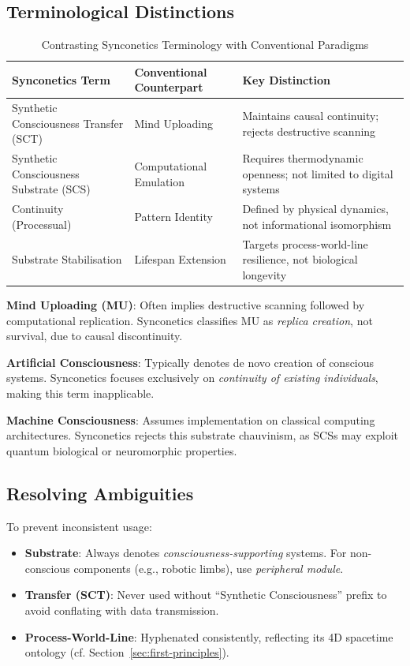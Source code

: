 \documentclass[10pt]{article}
\begin{document}
\begin{sloppypar}
  \subsection{Terminological Distinctions}
  \begin{table}[ht]
    \centering
    \caption{Contrasting Synconetics Terminology with Conventional Paradigms}
    \begin{tabular}{p{}p{}p{}}
      \toprule
      \textbf{Synconetics Term}               & \textbf{Conventional Counterpart} & \textbf{Key Distinction}                                        \\
      \midrule
      Synthetic Consciousness Transfer (SCT)  & Mind Uploading                    & Maintains causal continuity; rejects destructive scanning       \\
      Synthetic Consciousness Substrate (SCS) & Computational Emulation           & Requires thermodynamic openness; not limited to digital systems \\
      Continuity (Processual)                 & Pattern Identity                  & Defined by physical dynamics, not informational isomorphism     \\
      Substrate Stabilisation                 & Lifespan Extension                & Targets process-world-line resilience, not biological longevity \\
      \bottomrule
    \end{tabular}
    \label{tab:terminology}
  \end{table}

  \textbf{Mind Uploading (MU)}: Often implies destructive scanning followed by computational replication. Synconetics classifies MU as \textit{replica creation}, not survival, due to causal discontinuity.

  \textbf{Artificial Consciousness}: Typically denotes de novo creation of conscious systems. Synconetics focuses exclusively on \textit{continuity of existing individuals}, making this term inapplicable.

  \textbf{Machine Consciousness}: Assumes implementation on classical computing architectures. Synconetics rejects this substrate chauvinism, as SCSs may exploit quantum biological or neuromorphic properties.

  \subsection{Resolving Ambiguities}
  To prevent inconsistent usage:
  \begin{itemize}
    \item \textbf{Substrate}: Always denotes \textit{consciousness-supporting} systems. For non-conscious components (e.g., robotic limbs), use \textit{peripheral module}.
    \item \textbf{Transfer (SCT)}: Never used without “Synthetic Consciousness” prefix to avoid conflating with data transmission.
    \item \textbf{Process-World-Line}: Hyphenated consistently, reflecting its 4D spacetime ontology (cf. Section~\ref{sec:first-principles}).
  \end{itemize}


\end{sloppypar}
\end{document}
